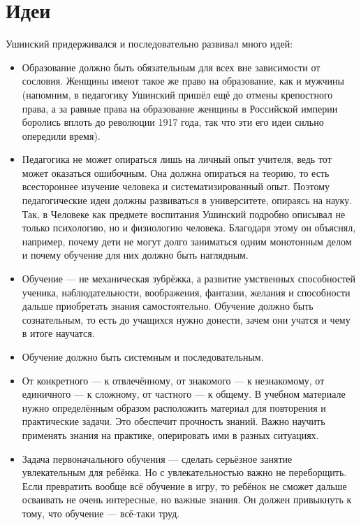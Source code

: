\section*  {Идеи}
Ушинский придерживался и последовательно развивал много идей:
\begin{itemize}
        \item Образование должно быть обязательным для всех вне зависимости от сословия. Женщины имеют такое же право на образование, как и мужчины (напомним, в педагогику Ушинский пришёл ещё до отмены крепостного права, а за равные права на образование женщины в Российской империи боролись вплоть до революции 1917 года, так что эти его идеи сильно опередили время).
        \item Педагогика не может опираться лишь на личный опыт учителя, ведь тот может оказаться ошибочным. Она должна опираться на теорию, то есть всестороннее изучение человека и систематизированный опыт. Поэтому педагогические идеи должны развиваться в университете, опираясь на науку. Так, в Человеке как предмете воспитания Ушинский подробно описывал не только психологию, но и физиологию человека. Благодаря этому он объяснял, например, почему дети не могут долго заниматься одним монотонным делом и почему обучение для них должно быть наглядным.
    
        \item Обучение — не механическая зубрёжка, а развитие умственных способностей ученика, наблюдательности, воображения, фантазии, желания и способности дальше приобретать знания самостоятельно. Обучение должно быть сознательным, то есть до учащихся нужно донести, зачем они учатся и чему в итоге научатся.
    
        \item Обучение должно быть системным и последовательным. 

        \item От конкретного — к отвлечённому, от знакомого — к незнакомому, от единичного — к сложному, от частного — к общему. В учебном материале нужно определённым образом расположить материал для повторения и практические задачи. Это обеспечит прочность знаний. Важно научить применять знания на практике, оперировать ими в разных ситуациях.
    
        \item Задача первоначального обучения — сделать серьёзное занятие увлекательным для ребёнка. Но с увлекательностью важно не переборщить. Если превратить вообще всё обучение в игру, то ребёнок не сможет дальше осваивать не очень интересные, но важные знания. Он должен привыкнуть к тому, что обучение — всё-таки труд.
    

\end{itemize}
